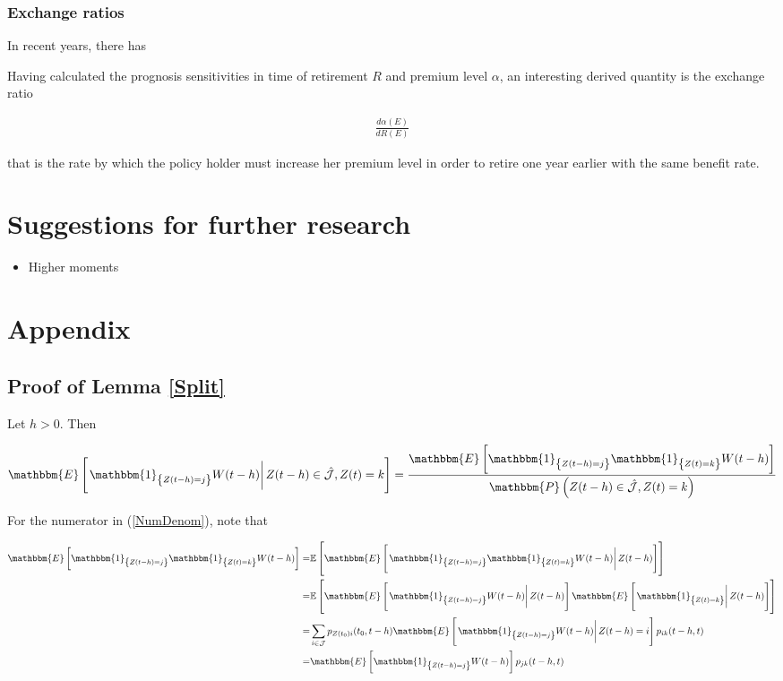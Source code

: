 \documentclass{book}
\newcommand{\1}[1]{\mathbbm{1}_{\left\lbrace #1 \right\rbrace}}
\newcommand{\expec}[1][def]{\mathbbm{E} \left[ #1 \right]}
\newcommand{\econd}[2][def]{\mathbbm{E} \left[ \left. #1 \right| #2 \right]}
\newcommand{\probability}[1][def]{\mathbbm{P} \left( #1 \right)}
\theoremstyle{break}
\theoremstyle{remark}
\numberwithin{equation}{section}
\begin{document}
\subsection{Exchange ratios}

In recent years, there has

Having calculated the prognosis sensitivities in time of retirement $R$ and premium level $\alpha$, an interesting derived quantity is the exchange ratio

\begin{align*}
	\frac{d \alpha (E)}{d R (E)}
\end{align*}

that is the rate by which the policy holder must increase her premium level in order to retire one year earlier with the same benefit rate. 

\chapter{Suggestions for further research}

\begin{itemize}
	\item Higher moments
\end{itemize}

\chapter{Appendix}

\section{Proof of Lemma \ref{Split}} \label{SplitProof}

Let $h>0$. Then

\begin{align} \label{NumDenom}
	\econd[\1{Z(t-h)=j} W(t-h)]{Z(t-h) \in \hat{\mathcal{J}}, Z(t) = k} = \frac{\expec[\1{Z(t-h)=j} \1{Z(t)=k} W(t-h)]}{\probability[Z(t-h) \in \hat{\mathcal{J}}, Z(t)=k]}
\end{align}

For the numerator in (\ref{NumDenom}), note that 

\begin{align*}
	\expec[\1{Z(t-h)=j} \1{Z(t)=k} W(t-h)] =& \mathbb{E} \left[ \econd[\1{Z(t-h)=j} \1{Z(t)=k} W(t-h)]{Z(t-h)} \right] \\
	=& \mathbb{E} \left[ \econd[\1{Z(t-h)=j} W(t-h)]{Z(t-h)} \econd[\1{Z(t)=k}]{Z(t-h)} \right] \\
	=& \sum_{i \in \mathcal{J}} p_{Z(t_0)i}(t_0,t-h) \econd[\1{Z(t-h)=j} W(t-h)]{Z(t-h)=i} p_{ik}(t-h,t) \\
	=& \expec[\1{Z(t-h)=j} W(t-h)] p_{jk}(t-h,t)
\end{align*}
\end{document}
